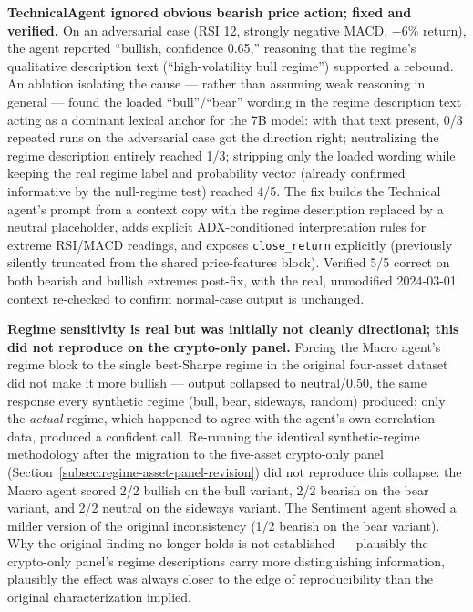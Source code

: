 \textbf{TechnicalAgent ignored obvious bearish price action; fixed and verified.} On an adversarial case (RSI 12, strongly negative MACD, $-6\%$ return), the agent reported ``bullish, confidence 0.65,'' reasoning that the regime's qualitative description text (``high-volatility bull regime'') supported a rebound. An ablation isolating the cause --- rather than assuming weak reasoning in general --- found the loaded ``bull''/``bear'' wording in the regime description text acting as a dominant lexical anchor for the 7B model: with that text present, 0/3 repeated runs on the adversarial case got the direction right; neutralizing the regime description entirely reached 1/3; stripping only the loaded wording while keeping the real regime label and probability vector (already confirmed informative by the null-regime test) reached 4/5. The fix builds the Technical agent's prompt from a context copy with the regime description replaced by a neutral placeholder, adds explicit ADX-conditioned interpretation rules for extreme RSI/MACD readings, and exposes \texttt{close\_return} explicitly (previously silently truncated from the shared price-features block). Verified 5/5 correct on both bearish and bullish extremes post-fix, with the real, unmodified 2024-03-01 context re-checked to confirm normal-case output is unchanged.

\textbf{Regime sensitivity is real but was initially not cleanly directional; this did not reproduce on the crypto-only panel.} Forcing the Macro agent's regime block to the single best-Sharpe regime in the original four-asset dataset did not make it more bullish --- output collapsed to neutral/0.50, the same response every synthetic regime (bull, bear, sideways, random) produced; only the \emph{actual} regime, which happened to agree with the agent's own correlation data, produced a confident call. Re-running the identical synthetic-regime methodology after the migration to the five-asset crypto-only panel (Section~\ref{subsec:regime-asset-panel-revision}) did not reproduce this collapse: the Macro agent scored 2/2 bullish on the bull variant, 2/2 bearish on the bear variant, and 2/2 neutral on the sideways variant. The Sentiment agent showed a milder version of the original inconsistency (1/2 bearish on the bear variant). Why the original finding no longer holds is not established --- plausibly the crypto-only panel's regime descriptions carry more distinguishing information, plausibly the effect was always closer to the edge of reproducibility than the original characterization implied.


